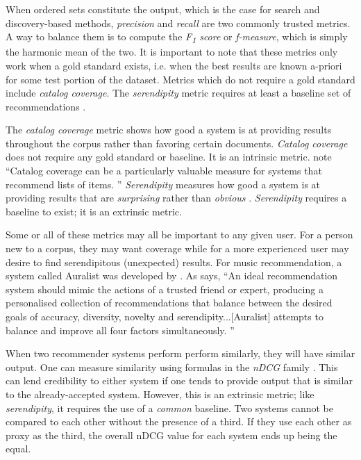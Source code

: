 When ordered sets constitute the output, which is the case for search and discovery-based methods, \textit{precision} and \textit{recall} are two commonly trusted metrics. A way to balance them is to compute the \textit{F\textsubscript{1} score} or \textit{f-measure}, which is simply the harmonic mean of the two. It is important to note that these metrics only work when a gold standard exists, i.e. when the best results are known a-priori for some test portion of the dataset. Metrics which do not require a gold standard include \textit{catalog coverage}. The \textit{serendipity} metric requires at least a baseline set of recommendations \citep{Ge:2010:BAE:1864708.1864761}.

The \textit{catalog coverage} metric shows how good a system is at providing results throughout the corpus rather than favoring certain documents. \textit{Catalog coverage} does not require any gold standard or baseline. It is an intrinsic metric. \cite{Ge:2010:BAE:1864708.1864761} note ``Catalog coverage can be a particularly valuable measure for systems that recommend lists of items. \citeyearpar{Ge:2010:BAE:1864708.1864761}'' \textit{Serendipity} measures how good a system is at providing results that are \textit{surprising} rather than \textit{obvious} \citep{Ge:2010:BAE:1864708.1864761}. \textit{Serendipity} requires a baseline to exist; it is an extrinsic metric.

Some or all of these metrics may all be important to any given user. For a person new to a corpus, they may want coverage while for a more experienced user may desire to find serendipitous (unexpected) results. For music recommendation, a system called Auralist was developed by \citeauthor{zhang2012auralist}. As \citeauthor{zhang2012auralist} says, ``An ideal recommendation system should mimic the actions of a trusted friend or expert, producing a personalised collection of recommendations that balance between the desired goals of accuracy, diversity, novelty and serendipity...[Auralist] attempts to balance and improve all four factors simultaneously. \citeyear{zhang2012auralist}''


When two recommender systems perform perform similarly, they will have similar output. One can measure similarity using formulas in the \textit{nDCG} family \citep{Wang:2006:TOT:1150402.1150450}. This can lend credibility to either system if one tends to provide output that is similar to the already-accepted system. However, this is an extrinsic metric; like \textit{serendipity}, it requires the use of a \textit{common} baseline. Two systems cannot be compared to each other without the presence of a third. If they use each other as proxy as the third, the overall nDCG value for each system ends up being the equal.
